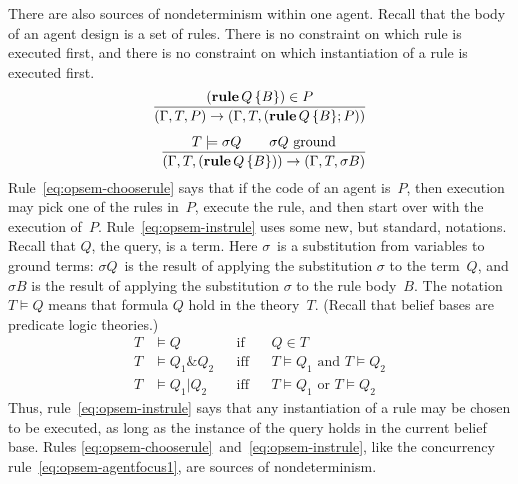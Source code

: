\documentclass[a4paper,12pt,oneside,fleqn]{book} %
\begin{document}
{There are also sources of nondeterminism within one agent. Recall that the
body of an agent design is a set of rules. There is no constraint on which
rule is executed first, and there is no constraint on which instantiation of
a rule is executed first.
\begin{align}
\frac
  {({\bf rule}\,Q\,\{B\}) \in P}
  {(\Gamma,T,P)\to(\Gamma,T,({\bf rule}\,Q\,\{B\};P))}
  \label{eq:opsem-chooserule}
\\[1ex]
\frac
  {T \models \sigma Q \qquad\text{$\sigma Q$ ground}}
  {(\Gamma,T,({\bf rule}\,Q\,\{B\}))\to(\Gamma,T,\sigma B)}
  \label{eq:opsem-instrule}
\end{align}
Rule~\eqref{eq:opsem-chooserule} says that if the code of an agent is~$P$,
then execution may pick one of the rules in~$P$, execute the rule, and then
start over with the execution of~$P$. Rule~\eqref{eq:opsem-instrule} uses
some new, but standard, notations. Recall that $Q$, the query, is a term.
Here $\sigma$~is a substitution from variables to ground terms: $\sigma
Q$~is the result of applying the substitution $\sigma$ to the term~$Q$, and
$\sigma B$ is the result of applying the substitution $\sigma$ to the rule
body~$B$. The notation $T\models Q$ means that formula $Q$ hold in the
theory~$T$. (Recall that belief bases are predicate logic theories.)
\begin{align}
T &\models Q  &&\text{if} && Q\in T \\
T &\models Q_1\&Q_2 &&\text{iff} &&\text{$T\models Q_1$ and $T\models Q_2$}\\
T &\models Q_1|Q_2 &&\text{iff} &&\text{$T\models Q_1$ or $T\models Q_2$}
\end{align}
Thus, rule~\eqref{eq:opsem-instrule} says that any instantiation of a rule
may be chosen to be executed, as long as the instance of the query holds in
the current belief base. Rules
\eqref{eq:opsem-chooserule}~and~\eqref{eq:opsem-instrule}, like the
concurrency rule~\eqref{eq:opsem-agentfocus1}, are sources of
nondeterminism.

}
\end{document}
